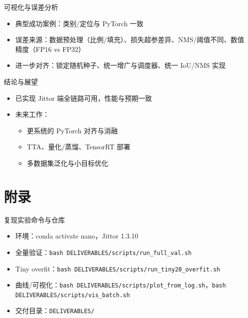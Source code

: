 \documentclass{beamer}
\begin{document}
\begin{frame}{可视化与误差分析}
  \begin{itemize}
    \item 典型成功案例：类别/定位与 PyTorch 一致
    \item 误差来源：数据预处理（比例/填充）、损失超参差异、NMS/阈值不同、数值精度（FP16 vs FP32）
    \item 进一步对齐：锁定随机种子、统一增广与调度器、统一 IoU/NMS 实现
  \end{itemize}
\end{frame}

\begin{frame}{结论与展望}
  \begin{itemize}
    \item 已实现 Jittor 端全链路可用，性能与预期一致
    \item 未来工作：
      \begin{itemize}
        \item 更系统的 PyTorch 对齐与消融
        \item TTA、量化/蒸馏、TensorRT 部署
        \item 多数据集泛化与小目标优化
      \end{itemize}
  \end{itemize}
\end{frame}

\appendix
\section*{附录}
\begin{frame}{复现实验命令与仓库}
  \begin{itemize}
    \item 环境：conda activate nano，Jittor 1.3.10
    \item 全量验证：\texttt{bash DELIVERABLES/scripts/run\_full\_val.sh}
    \item Tiny overfit：\texttt{bash DELIVERABLES/scripts/run\_tiny20\_overfit.sh}
    \item 曲线/可视化：\texttt{bash DELIVERABLES/scripts/plot\_from\_log.sh}，\texttt{bash DELIVERABLES/scripts/vis\_batch.sh}
    \item 交付目录：\texttt{DELIVERABLES/}
  \end{itemize}
\end{frame}
\end{document}
